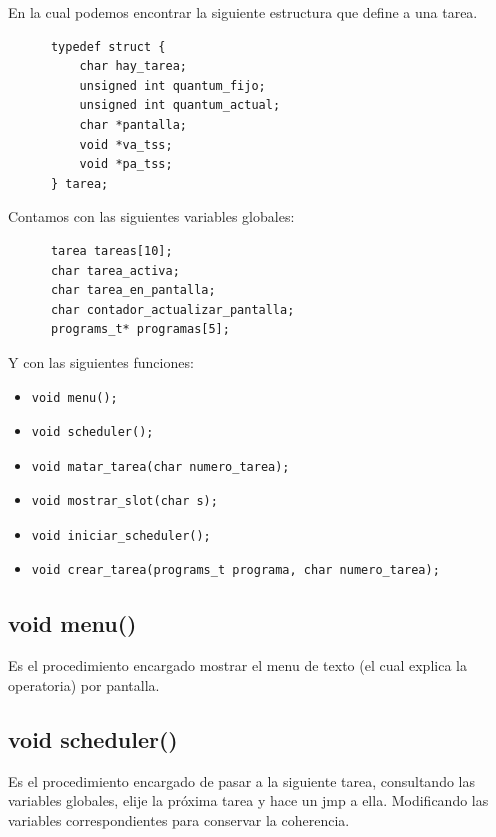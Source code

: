 \documentclass[a4paper,10pt]{article}
\begin{document}
En la cual podemos encontrar la siguiente estructura que define a una tarea.

\begin{verbatim}
      typedef struct {
          char hay_tarea;						
          unsigned int quantum_fijo;			
          unsigned int quantum_actual;		
          char *pantalla;					
          void *va_tss;						
          void *pa_tss;						
      } tarea;
\end{verbatim}

Contamos con las siguientes variables globales:

\begin{verbatim}
      tarea tareas[10];
      char tarea_activa;	
      char tarea_en_pantalla;
      char contador_actualizar_pantalla;
      programs_t* programas[5];
\end{verbatim}


Y con las siguientes funciones:

\begin{itemize}
\item \begin{verbatim}void menu(); \end{verbatim}
\item \begin{verbatim}void scheduler();\end{verbatim}
\item \begin{verbatim}void matar_tarea(char numero_tarea);\end{verbatim}
\item \begin{verbatim}void mostrar_slot(char s);\end{verbatim}
\item \begin{verbatim}void iniciar_scheduler();\end{verbatim}
\item \begin{verbatim}void crear_tarea(programs_t programa, char numero_tarea);\end{verbatim}
\end{itemize}

\subsection*{ void menu()}
Es el procedimiento encargado mostrar el menu de texto (el cual explica la operatoria) por pantalla.

\subsection*{ void scheduler()}
Es el procedimiento encargado de pasar a la siguiente tarea, consultando las variables globales, elije la próxima tarea y hace un jmp a ella. Modificando las variables correspondientes para conservar la coherencia.
\end{document}
